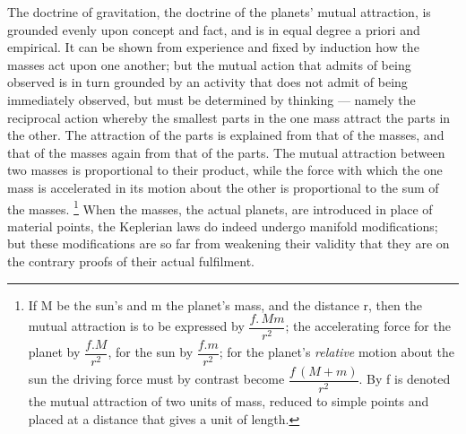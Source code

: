 \documentclass[12pt,a4paper]{book}
\begin{document}
The doctrine of gravitation, the doctrine of the planets' mutual attraction, is grounded evenly upon
concept and fact, and is in equal degree a priori and empirical. It can be shown from experience and
fixed by induction how the masses act upon one another; but the mutual action that admits of being
observed is in turn grounded by an activity
that does not admit of being immediately observed, but must be determined by thinking --- namely the
reciprocal action whereby the smallest parts in the one mass attract the parts in the other. The
attraction of the parts is explained from that of the masses, and that of the masses again from that of
the parts. The mutual attraction between two masses is proportional to their product, while the force
with which the one mass is accelerated in its motion about the other is proportional to the sum of the
masses.%
\footnote{%
If M be the sun's and m the planet's mass, and the distance r, then the mutual attraction is to be
expressed by $\dfrac{f.\,Mm}{r^{2}}$; the accelerating force for the planet by $\dfrac{f.M}{r^{2}}$, for
the sun by $\dfrac{f.m}{r^{2}}$; for the planet's \emph{relative} motion about the sun the driving force
must by contrast become $\dfrac{f\,(M + m)}{r^{2}}$. By f is denoted the mutual
attraction of two units of mass, reduced to simple points and placed at a distance that gives a unit of
length.}
When the masses, the actual planets, are introduced in place of material points, the Keplerian laws do
indeed undergo manifold modifications; but these modifications are so far from weakening their validity
that they are on the contrary proofs of their actual fulfilment.
\end{document}
